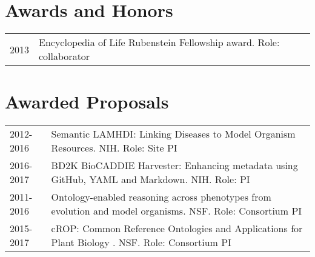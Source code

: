 \documentclass[11pt,fullpage]{article}
\begin{document}



\section*{Awards and Honors}

\begin{longtable}{p{0.5in}|p{5.5in}}

 2013 & Encyclopedia of Life Rubenstein Fellowship award. Role: collaborator \\

\end{longtable}


\section*{Awarded Proposals}

\begin{longtable}{p{0.5in}|p{5.5in}}

2012-2016 & Semantic LAMHDI: Linking Diseases to Model Organism Resources. NIH. Role: Site PI \\
2016-2017 & BD2K BioCADDIE Harvester: Enhancing metadata using GitHub, YAML and Markdown. NIH. Role: PI \\
2011-2016 & Ontology-enabled reasoning across phenotypes from evolution and model organisms. NSF. Role: Consortium PI \\
2015-2017 & cROP: Common Reference Ontologies and Applications for Plant Biology . NSF. Role: Consortium PI \\

\end{longtable}


\end{document}
